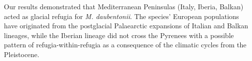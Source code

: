 {Our results demonstrated that Mediterranean Peninsulas (Italy, Iberia, Balkan) acted as glacial refugia for \emph{M. daubentonii}. The species' European populations have originated from the postglacial Palaearctic expansions of Italian and Balkan lineages, while the Iberian lineage did not cross the Pyrenees with a possible pattern of refugia-within-refugia as a consequence of the climatic cycles from the Pleistocene.
} %
